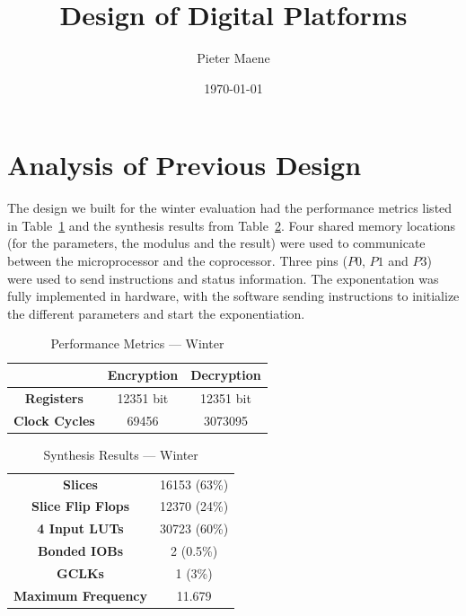 \documentclass[a4paper]{article}
\title{Design of Digital Platforms}
\author{Pieter Maene}
\date{\today}
\begin{document}

\maketitle

\section{Analysis of Previous Design}

The design we built for the winter evaluation had the performance metrics listed in Table~\ref{tab:performance_metrics_winter} and the synthesis results from Table~\ref{tab:synthesis_results_winter}. Four shared memory locations (for the parameters, the modulus and the result) were used to communicate between the microprocessor and the coprocessor. Three pins ($P0$, $P1$ and $P3$) were used to send instructions and status information. The exponentation was fully implemented in hardware, with the software sending instructions to initialize the different parameters and start the exponentiation.\\

\begin{table}[H]
	\begin{center}	
		\begin{tabular}{c|c|c}
			 & \textbf{Encryption} & \textbf{Decryption}\\\hline
			\textbf{Registers} & 12351 bit & 12351 bit\\
		 	\textbf{Clock Cycles} & 69456 & 3073095\\
		\end{tabular}
	\end{center}
	\caption{Performance Metrics --- Winter}
	\label{tab:performance_metrics_winter}
\end{table} 

\begin{table}[H]
	\begin{center}	
		\begin{tabular}{c|c}
			\textbf{Slices} & 16153 (63\%)\\
			\textbf{Slice Flip Flops} & 12370 (24\%)\\
			\textbf{4 Input LUTs} & 30723 (60\%)\\
			\textbf{Bonded IOBs} & 2 (0.5\%)\\
			\textbf{GCLKs} & 1 (3\%)\\
			\textbf{Maximum Frequency} & 11.679 \mega\hertz
		\end{tabular}
	\end{center}
	\caption{Synthesis Results --- Winter}
	\label{tab:synthesis_results_winter}
\end{table}
\end{document}

